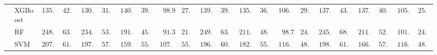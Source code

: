 \begin{tabular}{ll|ll|llllll|llllll|llllll}
 & XGBoost  & $135.14$ & $42.27$ & $130.40$ & $31.97$ & $140.36$ & $39.19$ & $\phantom{0}98.96$ & $27.35$ & $139.77$ & $39.97$ & $135.79$ & $36.04$ & $106.84$ & $29.00$ & $137.05$ & $43.08$ & $137.13$ & $40.92$ & $105.88$ & $25.90$ \\
 & RF  & $248.10$ & $63.21$ & $234.96$ & $53.56$ & $191.50$ & $45.02$ & $\phantom{0}91.31$ & $21.77$ & $249.60$ & $63.00$ & $211.29$ & $48.38$ & $\phantom{0}98.71$ & $24.80$ & $245.15$ & $68.82$ & $211.40$ & $52.49$ & $101.87$ & $24.11$ \\
 & SVM  & $207.71$ & $61.55$ & $197.11$ & $57.98$ & $159.04$ & $55.73$ & $107.77$ & $55.70$ & $196.65$ & $60.89$ & $182.60$ & $55.31$ & $116.76$ & $48.12$ & $198.36$ & $61.76$ & $166.94$ & $57.46$ & $116.65$ & $48.17$ \\
\hline 
\end{tabular}

